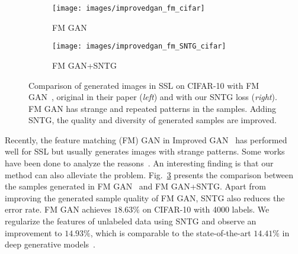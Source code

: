 \documentclass[10pt,twocolumn,letterpaper]{article}
\begin{document}
\label{app:gan}
\begin{figure}[h]\vspace{-.2cm}
	\centering
	\begin{subfigure}{.23\textwidth}
		\centering
		\texttt{[image: images/improvedgan\_fm\_cifar]}
		\caption{FM GAN}
		\label{fig:fm}
	\end{subfigure}%
	\hfill
	\begin{subfigure}{.23\textwidth}
		\centering
		\texttt{[image: images/improvedgan\_fm\_SNTG\_cifar]}
		\caption{FM GAN+SNTG}
		\label{fig:fmsntg}
	\end{subfigure}\vspace{-.2cm}
	\caption{Comparison of generated images in SSL on CIFAR-10 with FM GAN~\cite{salimans2016improved}, original in their paper ({\em left}) and with our SNTG loss ({\em right}). FM GAN has strange and repeated patterns in the samples. Adding SNTG, the quality and diversity of generated samples are improved.}
	\label{fig:cifar10}\vspace{-.1cm}
\end{figure}
Recently, the feature matching (FM) GAN in Improved GAN~\cite{salimans2016improved} has performed well for SSL but usually generates images with strange patterns. Some works have been done to analyze the reasons~\cite{dai2017good,li2017triple,kumar2017improved}. An interesting finding is that our method can also alleviate the problem.
Fig.~\ref{fig:cifar10} presents the comparison between the samples generated in FM GAN~\cite{salimans2016improved} and FM GAN+SNTG. Apart from improving the generated sample quality of FM GAN, SNTG also reduces the error rate. FM GAN achieves $18.63\%$ on CIFAR-10 with 4000 labels. We regularize the features of unlabeled data using SNTG and observe an improvement to $14.93\%$, which is comparable to the state-of-the-art $14.41\%$ in deep generative models~\cite{dai2017good}.
\end{document}
